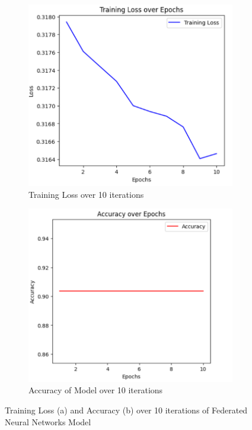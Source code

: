 \documentclass[11pt]{article}
\begin{document}
\begin{figure}[h]
    \centering
    \begin{subfigure}[b]{0.43\textwidth}
        \centering
        \includegraphics[width=\textwidth]{images/results1.PNG}
        \caption{Training Loss over 10 iterations}
        \label{fig:los-2} %
    \end{subfigure}
    \hfill
    \begin{subfigure}[b]{0.45\textwidth}
        \centering
        \includegraphics[width=\textwidth]{images/Results2.PNG}
        \caption{Accuracy of Model over 10 iterations}
        \label{fig:accuracy-1}
    \end{subfigure}
    
    \caption{Training Loss (a) and Accuracy (b) over 10 iterations of Federated Neural Networks Model}
    \label{fig:results-1}
\end{figure}
\end{document}
